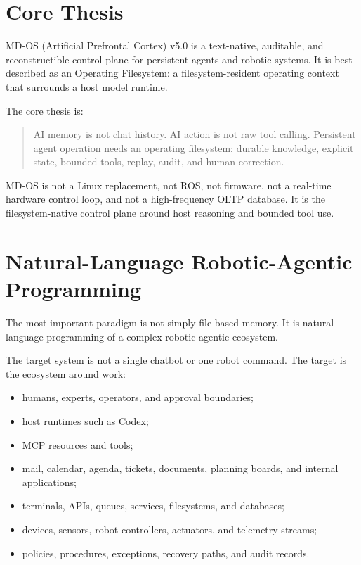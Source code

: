 \documentclass[11pt,a4paper]{article}
\begin{document}
\section{Core Thesis}

MD-OS (Artificial Prefrontal Cortex) v5.0 is a text-native, auditable, and reconstructible control
plane for persistent agents and robotic systems. It is best described as an
Operating Filesystem: a filesystem-resident operating context that surrounds a
host model runtime.

The core thesis is:

\begin{quote}
AI memory is not chat history. AI action is not raw tool calling. Persistent
agent operation needs an operating filesystem: durable knowledge, explicit
state, bounded tools, replay, audit, and human correction.
\end{quote}

MD-OS is not a Linux replacement, not ROS, not firmware, not a real-time
hardware control loop, and not a high-frequency OLTP database. It is the
filesystem-native control plane around host reasoning and bounded tool use.

\section{Natural-Language Robotic-Agentic Programming}

The most important paradigm is not simply file-based memory. It is
natural-language programming of a complex robotic-agentic ecosystem.

The target system is not a single chatbot or one robot command. The target is
the ecosystem around work:

\begin{itemize}
  \item humans, experts, operators, and approval boundaries;
  \item host runtimes such as Codex;
  \item MCP resources and tools;
  \item mail, calendar, agenda, tickets, documents, planning boards, and
  internal applications;
  \item terminals, APIs, queues, services, filesystems, and databases;
  \item devices, sensors, robot controllers, actuators, and telemetry streams;
  \item policies, procedures, exceptions, recovery paths, and audit records.
\end{itemize}
\end{document}
